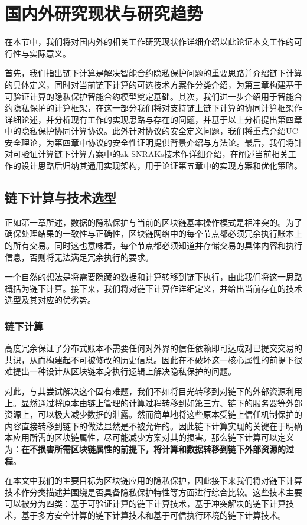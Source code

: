 \chapter{国内外研究现状与研究趋势}
在本节中，我们将对国内外的相关工作研究现状作详细介绍以此论证本文工作的可行性与实际意义。

首先，我们指出链下计算是解决智能合约隐私保护问题的重要思路并介绍链下计算的具体定义，同时对当前链下计算的可选技术方案作分类介绍，为第三章构建基于可验证计算的隐私保护智能合约模型奠定基础。其次，我们进一步介绍用于智能合约隐私保护的计算框架，在这一部分我们将对支持链上链下计算的协同计算框架作详细论述，并分析现有工作的实现思路与存在的问题，并基于以上分析提出第四章中的隐私保护协同计算协议。此外针对协议的安全定义问题，我们将重点介绍UC安全理论，为第四章中协议的安全性证明提供背景介绍与方法论。最后，我们将针对可验证计算链下计算方案中的zk-SNRAKs技术作详细介绍，在阐述当前相关工作的设计思路后归纳其通用实现架构，用于论证第五章中的实现方案和优化策略。

\section{链下计算与技术选型}
正如第一章所述，数据的隐私保护与当前的区块链基本操作模式是相冲突的。为了确保处理结果的一致性与正确性，区块链网络中的每个节点都必须冗余执行账本上的所有交易。同时这也意味着，每个节点都必须知道并存储交易的具体内容和执行信息，否则将无法满足冗余执行的要求。

一个自然的想法是将需要隐藏的数据和计算转移到链下执行，由此我们将这一思路概括为链下计算。接下来，我们将对链下计算作详细定义，并给出当前存在的技术选型及其对应的优劣势。
\subsection{链下计算}
高度冗余保证了分布式账本不需要任何对外界的信任依赖即可达成对已提交交易的共识，从而构建起不可被修改的历史信息。因此在不破坏这一核心属性的前提下很难提出一种设计从区块链本身执行逻辑上解决隐私保护的问题。

对此，与其尝试解决这个固有难题，我们不如将目光转移到对链下的外部资源利用上。显然通过将原本由链上管理的计算过程转移到如第三方、链下的服务器等外部资源上，可以极大减少数据的泄露。然而简单地将这些原本受链上信任机制保护的内容直接转移到链下的做法显然是不被允许的。因此链下计算实现的关键在于明确本应用所需的区块链属性，尽可能减少方案对其的损害。那么链下计算可以定义为：\textbf{在不损害所需区块链属性的前提下，将计算和数据转移到链下外部资源的过程}。

在本文中我们的主要目标为区块链应用的隐私保护，因此接下来我们将对链下计算技术作分类描述并围绕是否具备隐私保护特性等方面进行综合比较。这些技术主要可以被分为四类：基于可验证计算的链下计算技术，基于冲突解决的链下计算技术，基于多方安全计算的链下计算技术和基于可信执行环境的链下计算技术。

